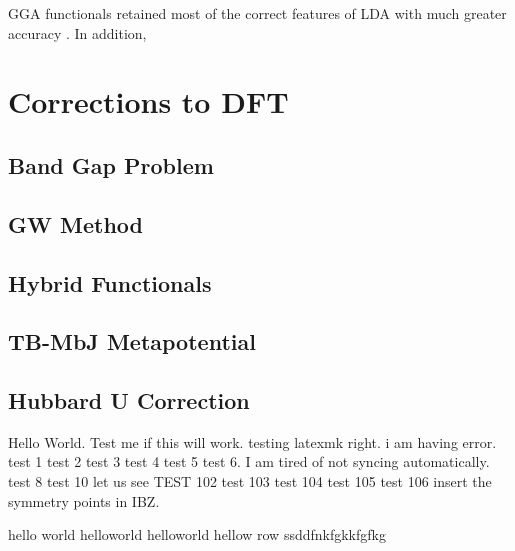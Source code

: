 GGA functionals retained most of the correct features of LDA with much greater accuracy \citep{Burke1997}. In addition,

\section{Corrections to DFT}
\subsection{Band Gap Problem}
\subsection{GW Method}
\subsection{Hybrid Functionals}
\subsection{TB-MbJ Metapotential}
\subsection{Hubbard U Correction}
Hello World. Test me if this will work. testing latexmk right. i am  having error. test 1 test 2 test 3    test 4 test 5 test 6. I am tired of not syncing automatically. test 8 test 10
let us see
TEST 102
test 103
test 104 test 105 test 106
	{\color{red} insert the symmetry points in IBZ.}

hello world
helloworld
helloworld
hellow row ssddfnkfgkkfgfkg

